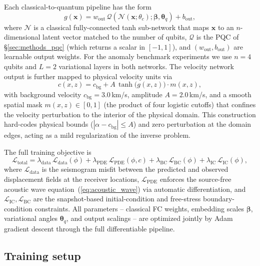 \documentclass[11pt,a4paper]{article}
\begin{document}
Each classical-to-quantum pipeline has the form
\begin{equation}
    g(\mathbf{x}) = w_\text{out}\, \mathcal{Q}\!\left(\mathcal{N}(\mathbf{x}; \theta_c); \boldsymbol{\beta}, \boldsymbol{\theta}_q\right) + b_\text{out},
\end{equation}
where $\mathcal{N}$ is a classical fully-connected tanh sub-network that maps $\mathbf{x}$ to an $n$-dimensional latent vector matched to the number of qubits, $\mathcal{Q}$ is the PQC of \S\ref{sec:methods_pqc} (which returns a scalar in $[-1,1]$), and $(w_\text{out}, b_\text{out})$ are learnable output weights. For the anomaly benchmark experiments we use $n = 4$ qubits and $L = 2$ variational layers in both networks. The velocity network output is further mapped to physical velocity units via
\begin{equation}
    c(x,z) = c_\text{bg} + A\, \tanh\!\big(g(x,z)\big) \cdot m(x,z),
    \label{eq:velocity_output}
\end{equation}
with background velocity $c_\text{bg} = 3.0$\,km/s, amplitude $A = 2.0$\,km/s, and a smooth spatial mask $m(x,z) \in [0,1]$ (the product of four logistic cutoffs) that confines the velocity perturbation to the interior of the physical domain. This construction hard-codes physical bounds ($|\alpha - c_\text{bg}| \leq A$) and zero perturbation at the domain edges, acting as a mild regularization of the inverse problem.

The full training objective is
\begin{equation}
\mathcal{L}_\text{total}
= \lambda_\text{data}\,\mathcal{L}_\text{data}(\phi)
+ \lambda_\text{PDE}\,\mathcal{L}_\text{PDE}(\phi, c)
+ \lambda_\text{BC}\,\mathcal{L}_\text{BC}(\phi)
+ \lambda_\text{IC}\,\mathcal{L}_\text{IC}(\phi),
\end{equation}
where $\mathcal{L}_\text{data}$ is the seismogram misfit between the predicted and observed displacement fields at the receiver locations, $\mathcal{L}_\text{PDE}$ enforces the source-free acoustic wave equation~(\ref{eq:acoustic_wave}) via automatic differentiation, and $\mathcal{L}_\text{IC}, \mathcal{L}_\text{BC}$ are the snapshot-based initial-condition and free-stress boundary-condition constraints. All parameters -- classical FC weights, embedding scales $\boldsymbol{\beta}$, variational angles $\boldsymbol{\theta}_q$, and output scalings -- are optimized jointly by Adam gradient descent through the full differentiable pipeline.

\subsection{Training setup}
\label{sec:methods_training}
\end{document}
